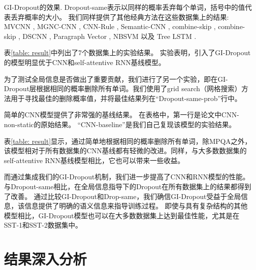 \begin{table}[t]
\begin{small}
\caption{GI-Dropout的效果.
Dropout-same表示以同样的概率丢弃每个单词，括号中的值代表丢弃概率的大小。
我们同样提供了其他经典方法在这些数据集上的结果: MVCNN \cite{yin2015multichannel}, MGNC-CNN \cite{zhang2016mgnc}, CNN-Rule \cite{hu2016harnessing}, Semantic-CNN \cite{li2017initializing}, combine-skip \cite{kiros2015skip}, combine-skip \cite{kiros2015skip}, DSCNN \cite{zhang2016dependency}, Paragraph Vector \cite{le2014distributed}, NBSVM \cite{wang2012baselines} 以及 Tree LSTM \cite{tai2015improved}.
}
\label{table: result}
\qquad
\end{small}
\end{table}

表\ref{table: result}中列出了7个数据集上的实验结果。
实验表明，引入了GI-Dropout的模型明显优于CNN和self-attentive RNN基线模型。

为了测试全局信息是否做出了重要贡献，我们进行了另一个实验，即在GI-Dropout层根据相同的概率删除所有单词。我们使用了grid search（网格搜索）方法用于寻找最佳的删除概率值，并将最佳结果列在``Dropout-same-prob''行中。

简单的CNN模型提供了非常强的基线结果。
在表格中，第一行是论文\cite{kim2014convolutional}中CNN-non-static的原始结果。
``CNN-baseline''是我们自己复现该模型的实验结果。

表\ref{table: result}显示，通过简单地根据相同的概率删除所有单词，除MPQA之外，该模型相对于所有数据集的CNN基线都有轻微的改进。同样，与大多数数据集的self-attentive RNN基线模型相比，它也可以带来一些收益。

而通过集成我们的GI-Dropout机制，我们进一步提高了CNN和RNN模型的性能。与Dropout-same相比，在全局信息指导下的Dropout在所有数据集上的结果都得到了改善。
通过比较GI-Dropout和Drop-same，我们确信GI-Dropout受益于全局信息，该信息提供了明确的语义信息来指导训练过程。
即使与具有复杂结构的其他模型相比，GI-Dropout模型也可以在大多数数据集上达到最佳性能，尤其是在SST-1和SST-2数据集中。

\section{结果深入分析}

